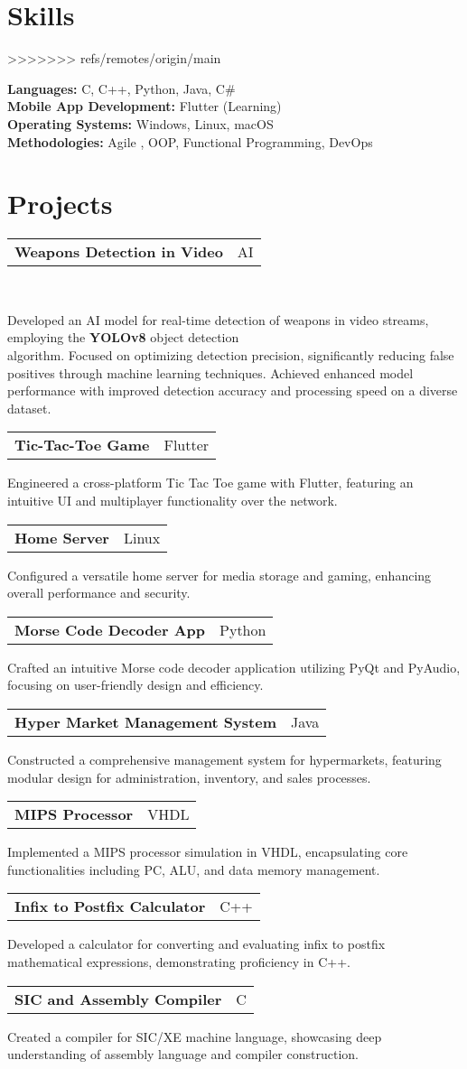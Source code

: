 \documentclass[letterpaper,11pt]{article}
\makeatletter
\newcommand{\resumeItem}[1]{\item\small{{#1 \vspace{-2pt}}}}
\newcommand{\resumeProjectHeading}[2]{\vspace{-2pt}\item
    \begin{tabular*}{0.97\textwidth}{l@{\extracolsep{\fill}}r}
      \small#1 & #2 \\
    \end{tabular*}\vspace{-7pt}
}
\makeatother
\begin{document}
\section{Skills}
\resumeSubHeadingListStart
>>>>>>> refs/remotes/origin/main
    \small{\item{
        \textbf{Languages:} C, C++, Python, Java, C\# \\
        \textbf{Mobile App Development:} Flutter (Learning)\\
        \textbf{Operating Systems:} Windows, Linux, macOS \\
        \textbf{Methodologies:}{ Agile , OOP, Functional Programming, DevOps}
}
\resumeSubHeadingListEnd

\section{Projects}
\resumeSubHeadingListStart
    \resumeProjectHeading
          {\textbf{Weapons Detection in Video}}{AI}\\
              \resumeItem{Developed an AI model for real-time detection of weapons in video streams, employing the \textbf{YOLOv8} object detection\\ algorithm. Focused on optimizing detection precision, significantly reducing false positives through machine learning techniques. Achieved enhanced model performance with improved detection accuracy and processing speed on a diverse dataset.}
    \resumeProjectHeading
          {\textbf{Tic-Tac-Toe Game}}{Flutter}
          \resumeItem{Engineered a cross-platform Tic Tac Toe game with Flutter, featuring an intuitive UI and multiplayer functionality over the network.\\}
    \resumeProjectHeading
          {\textbf{Home Server}}{Linux}
          \resumeItem{Configured a versatile home server for media storage and gaming, enhancing overall performance and security.}
    \resumeProjectHeading
          {\textbf{Morse Code Decoder App}}{Python}
          \resumeItem{Crafted an intuitive Morse code decoder application utilizing PyQt and PyAudio, focusing on user-friendly design and efficiency.}
    \resumeProjectHeading
          {\textbf{Hyper Market Management System}}{Java}
          \resumeItem{Constructed a comprehensive management system for hypermarkets, featuring modular design for administration, inventory, and sales processes.}
    \resumeProjectHeading
          {\textbf{MIPS Processor}}{VHDL}
          \resumeItem{Implemented a MIPS processor simulation in VHDL, encapsulating core functionalities including PC, ALU, and data memory management.}
    \resumeProjectHeading
          {\textbf{Infix to Postfix Calculator}}{C++}
          \resumeItem{Developed a calculator for converting and evaluating infix to postfix mathematical expressions, demonstrating proficiency in C++.}
    \resumeProjectHeading
          {\textbf{SIC and Assembly Compiler}}{C}
          \resumeItem{Created a compiler for SIC/XE machine language, showcasing deep understanding of assembly language and compiler construction.}
\resumeSubHeadingListEnd


}
\end{document}
